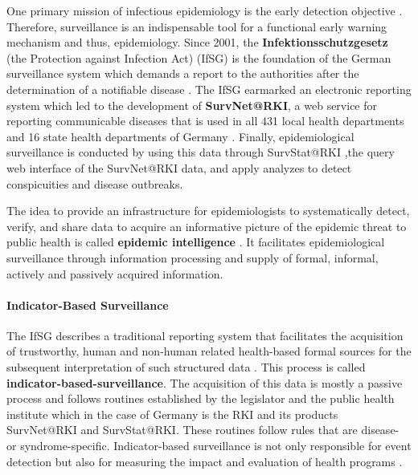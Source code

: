   One primary mission of infectious epidemiology is the early detection objective \citep{EarlyDetection}.
  Therefore, surveillance is an indispensable tool for a functional early warning mechanism and thus, epidemiology.
  Since 2001, the \textbf{Infektionsschutzgesetz} (the Protection against Infection Act) (\gls{IfSG})
  is the foundation of the German surveillance system which demands a report to the authorities after the determination of a notifiable disease \citep{IfSG}.
  The IfSG earmarked an electronic reporting system which led to the development of \textbf{SurvNet@RKI}, a web service for reporting communicable diseases that is used in all 431 local health departments and 16 state health departments of Germany \citep{Faensen2006}.
  Finally, epidemiological surveillance is conducted by using this data through SurvStat@RKI \citep{Faensen2004},the query web interface of the SurvNet@RKI data, and apply analyzes to detect conspicuities and disease outbreaks.

  The idea to provide an infrastructure for epidemiologists to systematically detect, verify, and share data to acquire an informative picture of the epidemic threat to public health is called \textbf{epidemic intelligence} \citep{EarlyDetection}.
  It facilitates epidemiological surveillance through information processing and supply of formal, informal, actively and passively acquired information.

\paragraph{Indicator-Based Surveillance}
  The IfSG describes a traditional reporting system that facilitates the acquisition of trustworthy, human and non-human related health-based formal sources for the subsequent interpretation of such structured data \citep{EarlyDetection}.
  This process is called \textbf{indicator-based-surveillance}.
  The acquisition of this data is mostly a passive process and follows routines established by the legislator and the public health institute which in the case of Germany is the RKI and its products SurvNet@RKI and SurvStat@RKI.
  These routines follow rules that are disease- or syndrome-specific.
  Indicator-based surveillance is not only responsible for event detection but also for measuring the impact and evaluation of health programs \citep{EarlyDetection}.

